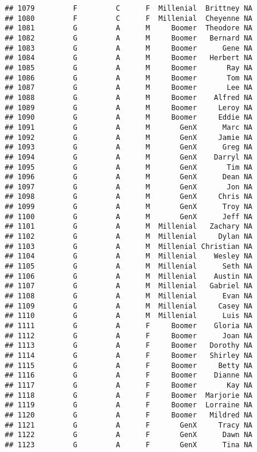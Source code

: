 \documentclass[
]{article}
\begin{document}
\begin{verbatim}
## 1079         F         C      F  Millenial  Brittney NA
## 1080         F         C      F  Millenial  Cheyenne NA
## 1081         G         A      M     Boomer  Theodore NA
## 1082         G         A      M     Boomer   Bernard NA
## 1083         G         A      M     Boomer      Gene NA
## 1084         G         A      M     Boomer   Herbert NA
## 1085         G         A      M     Boomer       Ray NA
## 1086         G         A      M     Boomer       Tom NA
## 1087         G         A      M     Boomer       Lee NA
## 1088         G         A      M     Boomer    Alfred NA
## 1089         G         A      M     Boomer     Leroy NA
## 1090         G         A      M     Boomer     Eddie NA
## 1091         G         A      M       GenX      Marc NA
## 1092         G         A      M       GenX     Jamie NA
## 1093         G         A      M       GenX      Greg NA
## 1094         G         A      M       GenX    Darryl NA
## 1095         G         A      M       GenX       Tim NA
## 1096         G         A      M       GenX      Dean NA
## 1097         G         A      M       GenX       Jon NA
## 1098         G         A      M       GenX     Chris NA
## 1099         G         A      M       GenX      Troy NA
## 1100         G         A      M       GenX      Jeff NA
## 1101         G         A      M  Millenial   Zachary NA
## 1102         G         A      M  Millenial     Dylan NA
## 1103         G         A      M  Millenial Christian NA
## 1104         G         A      M  Millenial    Wesley NA
## 1105         G         A      M  Millenial      Seth NA
## 1106         G         A      M  Millenial    Austin NA
## 1107         G         A      M  Millenial   Gabriel NA
## 1108         G         A      M  Millenial      Evan NA
## 1109         G         A      M  Millenial     Casey NA
## 1110         G         A      M  Millenial      Luis NA
## 1111         G         A      F     Boomer    Gloria NA
## 1112         G         A      F     Boomer      Joan NA
## 1113         G         A      F     Boomer   Dorothy NA
## 1114         G         A      F     Boomer   Shirley NA
## 1115         G         A      F     Boomer     Betty NA
## 1116         G         A      F     Boomer    Dianne NA
## 1117         G         A      F     Boomer       Kay NA
## 1118         G         A      F     Boomer  Marjorie NA
## 1119         G         A      F     Boomer  Lorraine NA
## 1120         G         A      F     Boomer   Mildred NA
## 1121         G         A      F       GenX     Tracy NA
## 1122         G         A      F       GenX      Dawn NA
## 1123         G         A      F       GenX      Tina NA

\end{verbatim}
\end{document}
